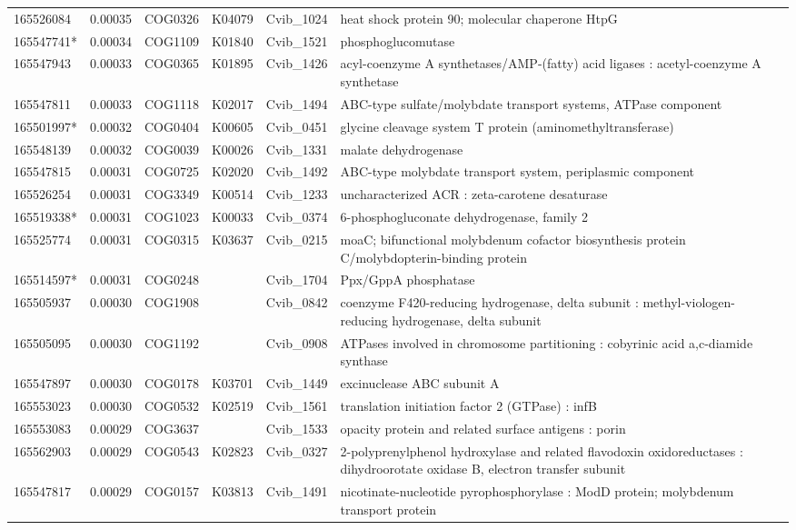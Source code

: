 \begin{landscape}
\begin{longtable}{p{1.8cm}p{0.9cm}p{2.2cm}p{1cm}p{2.8cm}p{13.4cm}}
165526084&0.00035&COG0326&K04079&Cvib\_1024&heat shock protein 90; molecular chaperone HtpG \\
165547741*&0.00034&COG1109&K01840&Cvib\_1521&phosphoglucomutase \\
165547943&0.00033&COG0365&K01895&Cvib\_1426&acyl-coenzyme A synthetases/AMP-(fatty) acid ligases : acetyl-coenzyme A synthetase \\
165547811&0.00033&COG1118&K02017&Cvib\_1494&ABC-type sulfate/molybdate transport systems, ATPase component \\
165501997*&0.00032&COG0404&K00605&Cvib\_0451&glycine cleavage system T protein (aminomethyltransferase) \\
165548139&0.00032&COG0039&K00026&Cvib\_1331&malate dehydrogenase \\
165547815&0.00031&COG0725&K02020&Cvib\_1492&ABC-type molybdate transport system, periplasmic component \\
165526254&0.00031&COG3349&K00514&Cvib\_1233&uncharacterized ACR : zeta-carotene desaturase \\
165519338*&0.00031&COG1023&K00033&Cvib\_0374&6-phosphogluconate dehydrogenase, family 2 \\
165525774&0.00031&COG0315&K03637&Cvib\_0215&moaC; bifunctional molybdenum cofactor biosynthesis protein C/molybdopterin-binding protein \\
165514597*&0.00031&COG0248&&Cvib\_1704&Ppx/GppA phosphatase \\
165505937&0.00030&COG1908&&Cvib\_0842&coenzyme F420-reducing hydrogenase, delta subunit : methyl-viologen-reducing hydrogenase, delta subunit \\
165505095&0.00030&COG1192&&Cvib\_0908&ATPases involved in chromosome partitioning : cobyrinic acid a,c-diamide synthase \\
165547897&0.00030&COG0178&K03701&Cvib\_1449&excinuclease ABC subunit A \\
165553023&0.00030&COG0532&K02519&Cvib\_1561&translation initiation factor 2 (GTPase) : infB \\
165553083&0.00029&COG3637&&Cvib\_1533&opacity protein and related surface antigens : porin \\
165562903&0.00029&COG0543&K02823&Cvib\_0327&2-polyprenylphenol hydroxylase and related flavodoxin oxidoreductases : dihydroorotate oxidase B, electron transfer subunit \\
165547817&0.00029&COG0157&K03813&Cvib\_1491&nicotinate-nucleotide pyrophosphorylase : ModD protein; molybdenum transport protein \\

\end{longtable}
\end{landscape}
